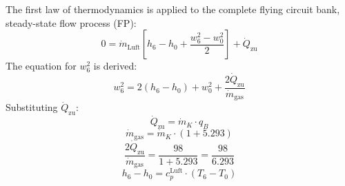 The first law of thermodynamics is applied to the complete flying circuit bank, steady-state flow process (FP):  
\[ 0 = \dot{m}_{\text{Luft}} \left[ h_6 - h_0 + \frac{w_6^2 - w_0^2}{2} \right] + \dot{Q}_\text{zu} \]  
The equation for \( w_6^2 \) is derived:  
\[ w_6^2 = 2 \left( h_6 - h_0 \right) + w_0^2 + \frac{2 \dot{Q}_\text{zu}}{\dot{m}_\text{gas}} \]  
Substituting \( \dot{Q}_\text{zu} \):  
\[ \dot{Q}_\text{zu} = \dot{m}_K \cdot q_B \]  
\[ \dot{m}_\text{gas} = \dot{m}_K \cdot \left( 1 + 5.293 \right) \]  
\[ \frac{2 \dot{Q}_\text{zu}}{\dot{m}_\text{gas}} = \frac{98}{1 + 5.293} = \frac{98}{6.293} \]  
\[ h_6 - h_0 = c_p^\text{Luft} \cdot \left( T_6 - T_0 \right) \]